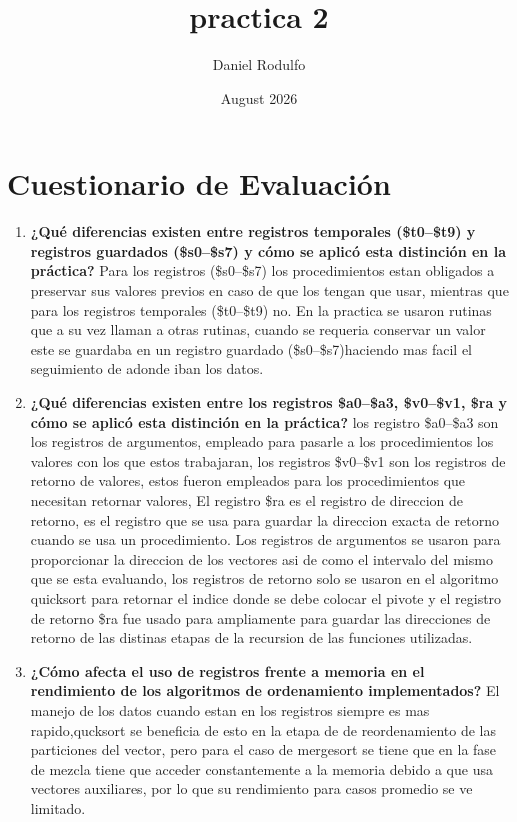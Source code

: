 \documentclass{article}
\title{practica 2}
\author{Daniel Rodulfo}
\date{August 2026}
\begin{document}
\maketitle

\section*{Cuestionario de Evaluación}

\begin{enumerate}
    \item \textbf{¿Qué diferencias existen entre registros temporales (\$t0–\$t9) y registros guardados (\$s0–\$s7) y cómo se aplicó esta distinción en la práctica?}
    Para los registros (\$s0–\$s7) los procedimientos estan obligados a preservar sus valores previos en caso de que los tengan que usar, mientras que para los registros temporales (\$t0–\$t9) no. En la practica se usaron rutinas que a su vez llaman a otras rutinas, cuando se requeria conservar un valor este se guardaba en un registro guardado (\$s0–\$s7)haciendo mas facil el seguimiento de adonde iban los datos.
    
    \item \textbf{¿Qué diferencias existen entre los registros \$a0–\$a3, \$v0–\$v1, \$ra y cómo se aplicó esta distinción en la práctica?}
    los registro \$a0–\$a3 son los registros de argumentos, empleado para pasarle a los procedimientos los valores con los que estos trabajaran, los registros \$v0–\$v1 son los registros de retorno de valores, estos fueron empleados para los procedimientos que necesitan retornar valores, El registro \$ra es el registro de direccion de retorno, es el registro que se usa para guardar la direccion exacta de retorno cuando se usa un procedimiento. Los registros de argumentos se usaron para proporcionar la direccion de los vectores asi de como el intervalo del mismo que se esta evaluando, los registros de retorno solo se usaron en el algoritmo quicksort para retornar el indice donde se debe colocar el pivote y el registro de retorno \$ra fue usado para ampliamente para guardar las direcciones de retorno de las distinas etapas de la recursion de las funciones utilizadas.
    
    \item \textbf{¿Cómo afecta el uso de registros frente a memoria en el rendimiento de los algoritmos de ordenamiento implementados?}
    El manejo de los datos cuando estan en los registros siempre es mas rapido,qucksort se beneficia de esto en la etapa de de reordenamiento de las particiones del vector, pero para el caso de mergesort se tiene que en la fase de mezcla tiene que acceder constantemente a la memoria debido a que usa vectores auxiliares, por lo que su rendimiento para casos promedio se ve limitado.
    

\end{enumerate}
\end{document}
